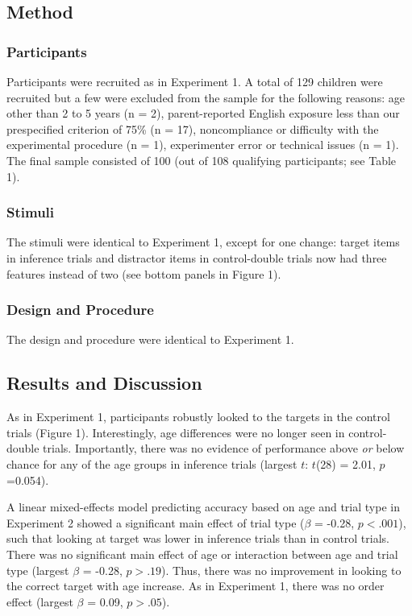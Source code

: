 \documentclass[a4paper,man,apacite,floatsintext]{apa6}
\begin{document}
\subsection{Method}\label{method-1}

\subsubsection{Participants}\label{participants-1}

Participants were recruited as in Experiment 1. A total of 129 children
were recruited but a few were excluded from the sample for the following
reasons: age other than 2 to 5 years (n = 2), parent-reported English
exposure less than our prespecified criterion of 75\% (n = 17),
noncompliance or difficulty with the experimental procedure (n = 1),
experimenter error or technical issues (n = 1). The final sample
consisted of 100 (out of 108 qualifying participants; see Table 1).

\subsubsection{Stimuli}\label{stimuli}

The stimuli were identical to Experiment 1, except for one change:
target items in inference trials and distractor items in control-double
trials now had three features instead of two (see bottom panels in
Figure 1).

\subsubsection{Design and Procedure}\label{design-and-procedure}

The design and procedure were identical to Experiment 1.

\subsection{Results and Discussion}\label{results-and-discussion-1}

As in Experiment 1, participants robustly looked to the targets in the
control trials (Figure 1). Interestingly, age differences were no longer
seen in control-double trials. Importantly, there was no evidence of
performance above \emph{or} below chance for any of the age groups in
inference trials (largest \(t\): \(t\)(28) = 2.01, \(p\) =0.054).

A linear mixed-effects model predicting accuracy based on age and trial
type in Experiment 2 showed a significant main effect of trial type
(\(\beta\) = -0.28, \(p <.001\)), such that looking at target was lower
in inference trials than in control trials. There was no significant
main effect of age or interaction between age and trial type (largest
\(\beta\) = -0.28, \(p >.19\)). Thus, there was no improvement in
looking to the correct target with age increase. As in Experiment 1,
there was no order effect (largest \(\beta\) = 0.09, \(p >.05\)).
\end{document}

